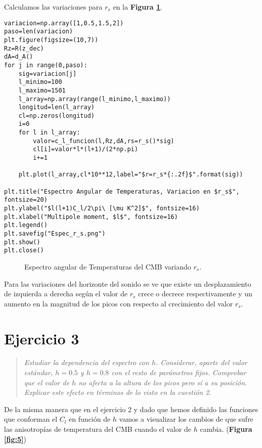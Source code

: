 \documentclass{article}
\begin{document}
Calculamos las variaciones para $r_s$ en la \textbf{Figura \ref{fig:4}}.
\begin{lstlisting}[style=Python]
variacion=np.array([1,0.5,1.5,2])
paso=len(variacion)
plt.figure(figsize=(10,7))
Rz=R(z_dec)
dA=d_A()
for j in range(0,paso):
    sig=variacion[j]
    l_minimo=100
    l_maximo=1501
    l_array=np.array(range(l_minimo,l_maximo))
    longitud=len(l_array)
    cl=np.zeros(longitud)
    i=0    
    for l in l_array:
        valor=c_l_funcion(l,Rz,dA,rs=r_s()*sig)
        cl[i]=valor*l*(l+1)/(2*np.pi)
        i+=1
    
    plt.plot(l_array,cl*10**12,label="$r=r_s*{:.2f}$".format(sig))

plt.title("Espectro Angular de Temperaturas, Variacion en $r_s$", fontsize=20)
plt.ylabel("$l(l+1)C_l/2\pi\ [\mu K^2]$", fontsize=16)
plt.xlabel("Multipole moment, $l$", fontsize=16)
plt.legend()
plt.savefig("Espec_r_s.png")
plt.show()
plt.close()
\end{lstlisting}

\begin{figure}[h]
    \begin{center}
    \end{center}
\caption{\label{fig:4} Espectro angular de Temperaturas del CMB variando $r_s$.}
\end{figure}

Para las variaciones del horizonte del sonido se ve que existe un desplazamiento de izquierda a derecha según el valor de $r_s$ crece o decrece respectivamente y un aumento en la magnitud de los picos con respecto al crecimiento del valor $r_s$.

\section{Ejercicio 3}
\begin{quote}
\textit{Estudiar la dependencia del espectro con $h$. Considerar, aparte del valor estándar, $h = 0.5$ y $h = 0.8$ con el resto de parámetros fijos. Comprobar que el valor de $h$ no afecta a la altura de los picos pero sí a su posición. Explicar este efecto en términos de lo visto en la cuestión 2.}
\end{quote}

De la misma manera que en el ejercicio 2 y dado que hemos definido las funciones que conforman el $C_l$ en función de $h$ vamos a visualizar los cambios de que sufre las anisotropías de temperatura del CMB cuando el valor de $h$ cambia. (\textbf{Figura \ref{fig:5}})
\end{document}
